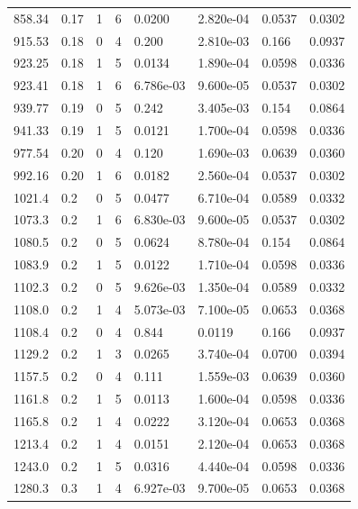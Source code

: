 \documentclass[preview]{standalone}
\begin{document}
{{{\begin{tabular}{L{1.2cm}C{1.2cm} C{0.3cm}C{0.5cm} C{1.4cm}C{1.4cm} C{1.4cm}C{1.4cm}}
  858.34  &  0.17  & 1     &  6 &  0.0200  & 2.820e-04  & 0.0537 &  0.0302   \\ 
  915.53  &  0.18  & 0     &  4 &  0.200  & 2.810e-03  & 0.166 &  0.0937   \\ 
  923.25  &  0.18  & 1     &  5 &  0.0134  & 1.890e-04  & 0.0598 &  0.0336   \\ 
  923.41  &  0.18  & 1     &  6 &  6.786e-03  & 9.600e-05  & 0.0537 &  0.0302   \\ 
  939.77  &  0.19  & 0     &  5 &  0.242  & 3.405e-03  & 0.154 &  0.0864   \\ 
  941.33  &  0.19  & 1     &  5 &  0.0121  & 1.700e-04  & 0.0598 &  0.0336   \\ 
  977.54  &  0.20  & 0     &  4 &  0.120  & 1.690e-03  & 0.0639 &  0.0360   \\ 
  992.16  &  0.20  & 1     &  6 &  0.0182  & 2.560e-04  & 0.0537 &  0.0302   \\ 
  1021.4  &   0.2  & 0     &  5 &  0.0477  & 6.710e-04  & 0.0589 &  0.0332   \\ 
  1073.3  &   0.2  & 1     &  6 &  6.830e-03  & 9.600e-05  & 0.0537 &  0.0302   \\ 
  1080.5  &   0.2  & 0     &  5 &  0.0624  & 8.780e-04  & 0.154 &  0.0864   \\ 
  1083.9  &   0.2  & 1     &  5 &  0.0122  & 1.710e-04  & 0.0598 &  0.0336   \\ 
  1102.3  &   0.2  & 0     &  5 &  9.626e-03  & 1.350e-04  & 0.0589 &  0.0332   \\ 
  1108.0  &   0.2  & 1     &  4 &  5.073e-03  & 7.100e-05  & 0.0653 &  0.0368   \\ 
  1108.4  &   0.2  & 0     &  4 &  0.844  & 0.0119  & 0.166 &  0.0937   \\ 
  1129.2  &   0.2  & 1     &  3 &  0.0265  & 3.740e-04  & 0.0700 &  0.0394   \\ 
  1157.5  &   0.2  & 0     &  4 &  0.111  & 1.559e-03  & 0.0639 &  0.0360   \\ 
  1161.8  &   0.2  & 1     &  5 &  0.0113  & 1.600e-04  & 0.0598 &  0.0336   \\ 
  1165.8  &   0.2  & 1     &  4 &  0.0222  & 3.120e-04  & 0.0653 &  0.0368   \\ 
  1213.4  &   0.2  & 1     &  4 &  0.0151  & 2.120e-04  & 0.0653 &  0.0368   \\ 
  1243.0  &   0.2  & 1     &  5 &  0.0316  & 4.440e-04  & 0.0598 &  0.0336   \\ 
  1280.3  &   0.3  & 1     &  4 &  6.927e-03  & 9.700e-05  & 0.0653 &  0.0368   \\ 

\end{tabular}}}}
\end{document}
